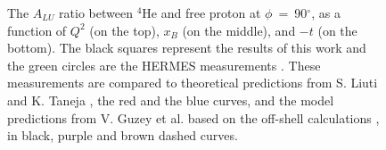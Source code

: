 \begin{figure}[tp]
\caption{The $A_{LU}$ ratio between $^4$He and free proton at 
   $\phi$~=~90$^{\circ}$, as a function of $Q^2$ (on the top), $x_B$ (on the 
   middle), and $-t$ (on the bottom). The black squares represent the results of 
   this work and the green circles are the HERMES measurements 
   \cite{HERMES_BSA}. These measurements are compared to theoretical 
   predictions from S. Liuti and K. Taneja \cite{simonetta_2}, the red and the 
blue curves, and the model predictions from V. Guzey et al. based on the 
off-shell calculations \cite{EMC_vadim_4}, in black, purple and brown dashed 
curves.}
\label{fig:coh_EMC_ratio_ALU}
\end{figure}
~\\


  
